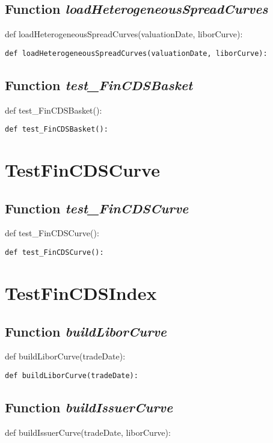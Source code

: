 \documentclass[twoside,11pt]{book}
\begin{document}
\subsection{Function {\it loadHeterogeneousSpreadCurves}}
def loadHeterogeneousSpreadCurves(valuationDate, liborCurve):

\begin{lstlisting}
def loadHeterogeneousSpreadCurves(valuationDate, liborCurve):
\end{lstlisting}

\subsection{Function {\it test\_FinCDSBasket}}
def test\_FinCDSBasket():

\begin{lstlisting}
def test_FinCDSBasket():
\end{lstlisting}


\newpage
\section{TestFinCDSCurve}

\subsection{Function {\it test\_FinCDSCurve}}
def test\_FinCDSCurve():

\begin{lstlisting}
def test_FinCDSCurve():
\end{lstlisting}


\newpage
\section{TestFinCDSIndex}

\subsection{Function {\it buildLiborCurve}}
def buildLiborCurve(tradeDate):

\begin{lstlisting}
def buildLiborCurve(tradeDate):
\end{lstlisting}

\subsection{Function {\it buildIssuerCurve}}
def buildIssuerCurve(tradeDate, liborCurve):
\end{document}
